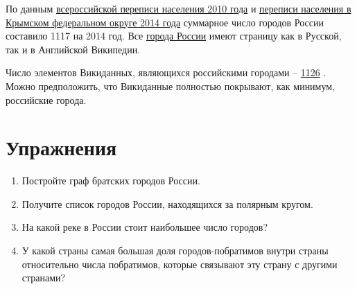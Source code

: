 По данным \href{https://bit.ly/2JPL34b}{всероссийской переписи населения 2010 года}\autocite{city_perepis_2010} и \href{https://bit.ly/2Lflc6F}{переписи населения в Крымском федеральном округе 2014 года}\autocite{city_perepis_2014} суммарное число городов России составило \num{1117} на 2014 год. Все \href{https://w.wiki/oLE}{города России} имеют страницу как в Русской, так и в Английской Википедии.

Число элементов Викиданных, являющихся российскими городами -- \href{https://w.wiki/jyP}{\num{1126}} . Можно предположить, что Викиданные полностью покрывают, как минимум, российские города. 

\newpage
\section{Упражнения}
\begin{enumerate}
\item Постройте граф братских городов России.
\item Получите список городов России, находящихся за полярным кругом.
\item На какой реке в России стоит наибольшее число городов?
\item У какой страны самая большая доля городов-побратимов внутри страны относительно числа побратимов, которые связывают эту страну с другими странами?
\end{enumerate}
